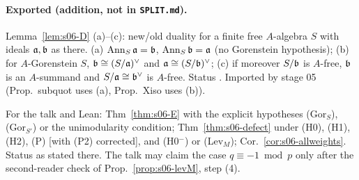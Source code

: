 \paragraph{Exported (addition, not in \texttt{SPLIT.md}).}
\begin{interface}\label{if:s06-lemD}
Lemma~\ref{lem:s06-D} (a)--(c): new/old duality for a finite free $A$-algebra $S$ with ideals $\mathfrak{a},\mathfrak{b}$ as there. (a) $\operatorname{Ann}_S\mathfrak{a}=\mathfrak{b}$,
$\operatorname{Ann}_S\mathfrak{b}=\mathfrak{a}$ (no Gorenstein hypothesis); (b) for $A$-Gorenstein $S$, $\mathfrak{b}\cong(S/\mathfrak{a})^\vee$ and $\mathfrak{a}\cong(S/\mathfrak{b})^\vee$; (c) if
moreover $S/\mathfrak{b}$ is $A$-free, $\mathfrak{b}$ is an $A$-summand and $S/\mathfrak{a}\cong\mathfrak{b}^\vee$ is $A$-free. Status \stproved. Imported by stage 05
(Prop.~subquot uses (a), Prop.~Xiso uses (b)).
\end{interface}
\begin{interface}\label{if:s06-defect}
For the talk and Lean: Thm~\ref{thm:s06-E} with the explicit hypotheses (Gor$_S$), (Gor$_{S'}$) or the unimodularity condition;
Thm~\ref{thm:s06-defect} under (H0), (H1), (H2), (P) [with (P2) corrected], and (H0$^-$) or (Lev$_M$); Cor.~\ref{cor:s06-allweights}.
Status as stated there. The talk may claim the case $q\equiv-1\bmod p$ only after the second-reader check of
Prop.~\ref{prop:s06-levM}, step (4).
\end{interface}

